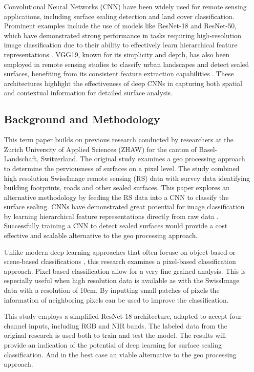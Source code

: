 Convolutional Neural Networks (CNN) have been widely used for remote sensing applications, 
including surface sealing detection and land cover classification. 
Prominent examples include the use of models like ResNet-18 and ResNet-50, which have demonstrated strong performance 
in tasks requiring high-resolution image classification due to their ability to effectively 
learn hierarchical feature representations \autocite{natyaDeepTransferLearning2022}. 
VGG19, known for its simplicity and depth, has also been employed in remote sensing studies
to classify urban landscapes and detect sealed surfaces, benefiting from its consistent 
feature extraction capabilities \autocite{alemTransferLearningModels2022}. 
These architectures highlight the effectiveness of deep CNNs in 
capturing both spatial and contextual information for detailed surface analysis.


\subsection{Background and Methodology}

This term paper builds on previous research conducted by researchers at the
Zurich University of Applied Sciences (ZHAW) for the canton of Basel-Landschaft, 
Switzerland. The original study examines a geo processing approach to determine the 
perviousness of surfaces on a pixel level. The study combined high resolution SwissImage
remote sensing (RS) data with survey data identifying building footprints, roads and other sealed surfaces.
This paper explores an alternative methodology by feeding the RS data into a CNN
to classify the surface sealing. CNNs have demonstrated great potential for image
classification by learning hierarchical feature representations directly from raw data \autocite{zhaoReviewConvolutionalNeural2024}.
Successfully training a CNN to detect sealed surfaces would provide a cost effective
and scalable alternative to the geo processing approach.

Unlike modern deep learning approaches that often focuse on object-based or scene-based 
classifications \autocite{thapaDeepLearningRemote2023}, this research examines a 
pixel-based classification approach. Pixel-based classification allow for a
very fine grained analysis. This is especially useful when high resolution data is
available as with the SwissImage data with a resolution of 10cm. By inputting small
patches of pixels the information of neighboring pixels can be used to improve the
classification.

This study employs a simplified ResNet-18 architecture, adapted to accept four-channel
inputs, including RGB and NIR bands. The labeled data from the original research
is used both to train and test the model. The results will provide an indication
of the potential of deep learning for surface sealing classification. And in
the best case an viable alternative to the geo processing approach.
